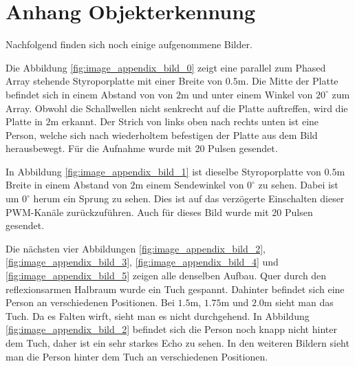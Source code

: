 \clearpage
\section{Anhang Objekterkennung}\label{sec:appendix_objekterkennung}
Nachfolgend finden sich noch einige aufgenommene Bilder.

Die Abbildung \ref{fig:image_appendix_bild_0} zeigt eine parallel zum Phased Array stehende Styroporplatte mit einer Breite von $0.5 \mathrm{m}$. Die Mitte der Platte befindet sich in einem Abstand von von $2 \mathrm{m}$ und unter einem Winkel von $20^{\circ}$ zum Array. Obwohl die Schallwellen nicht senkrecht auf die Platte auftreffen, wird die Platte in $2 \mathrm{m}$ erkannt. Der Strich von links oben nach rechts unten ist eine Person, welche sich nach wiederholtem befestigen der Platte aus dem Bild herausbewegt. Für die Aufnahme wurde mit 20 Pulsen gesendet.

In Abbildung \ref{fig:image_appendix_bild_1} ist dieselbe Styroporplatte von $0.5 \mathrm{m}$ Breite in einem Abstand von $2 \mathrm{m}$ einem Sendewinkel von $0^{\circ}$ zu sehen. Dabei ist um $0^{\circ}$ herum ein Sprung zu sehen. Dies ist auf das verzögerte Einschalten dieser PWM-Kanäle zurückzuführen. Auch für dieses Bild wurde mit 20 Pulsen gesendet.

Die nächsten vier Abbildungen \ref{fig:image_appendix_bild_2}, \ref{fig:image_appendix_bild_3}, \ref{fig:image_appendix_bild_4} und \ref{fig:image_appendix_bild_5} zeigen alle denselben Aufbau. Quer durch den reflexionsarmen Halbraum wurde ein Tuch gespannt. Dahinter befindet sich eine Person an verschiedenen Positionen. Bei $1.5 \mathrm{m}$, $1.75 \mathrm{m}$ und $2.0 \mathrm{m}$ sieht man das Tuch. Da es Falten wirft, sieht man es nicht durchgehend. In Abbildung \ref{fig:image_appendix_bild_2} befindet sich die Person noch knapp nicht hinter dem Tuch, daher ist ein sehr starkes Echo zu sehen. In den weiteren Bildern sieht man die Person hinter dem Tuch an verschiedenen Positionen.


